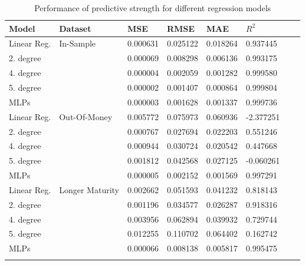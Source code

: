 \begin{table}[th]
\caption{Performance of predictive strength for different regression models}
\label{tab:euroPerformanceComparision}
\centering
\begin{tabular}{l l l l l l l l }
\toprule
\textbf{Model} & \textbf{Dataset} & \textbf{MSE} & \textbf{RMSE} & \textbf{MAE} & \textbf{$R^2$} \\
\midrule
Linear Reg. & In-Sample & 0.000631 & 0.025122 & 0.018264 & 0.937445\\
2. degree &  & 0.000069 & 0.008298 & 0.006136 & 0.993175\\
4. degree &  & 0.000004 & 0.002059 & 0.001282 & 0.999580\\
5. degree &  & 0.000002 & 0.001407 & 0.000864 & 0.999804\\
MLPs &  & 0.000003 & 0.001628 & 0.001337 & 0.999736\\
Linear Reg. & Out-Of-Money & 0.005772 & 0.075973 & 0.060936 & -2.377251\\
2. degree &  & 0.000767 & 0.027694 & 0.022203 & 0.551246\\
4. degree &  & 0.000944 & 0.030724 & 0.020542 & 0.447668\\
5. degree &  & 0.001812 & 0.042568 & 0.027125 & -0.060261\\
MLPs &  & 0.000005 & 0.002152 & 0.001569 & 0.997291\\
Linear Reg. & Longer Maturity & 0.002662 & 0.051593 & 0.041232 & 0.818143\\
2. degree &  & 0.001196 & 0.034577 & 0.026287 & 0.918316\\
4. degree &  & 0.003956 & 0.062894 & 0.039932 & 0.729744\\
5. degree &  & 0.012255 & 0.110702 & 0.064402 & 0.162742\\
MLPs &  & 0.000066 & 0.008138 & 0.005817 & 0.995475\\
\bottomrule\\
\end{tabular}
\end{table}


